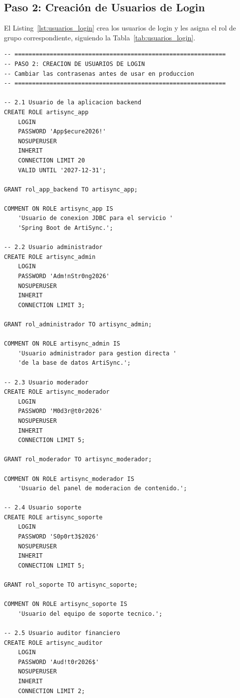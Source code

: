 \documentclass[conference, onecolumn]{IEEEtran}
\begin{document}
\subsection{Paso 2: Creación de Usuarios de Login}

El Listing~\ref{lst:usuarios_login} crea los usuarios de login y les asigna el rol de grupo correspondiente, siguiendo la Tabla~\ref{tab:usuarios_login}.

\begin{lstlisting}[caption={Creación de usuarios de login}, label={lst:usuarios_login}]
-- ============================================================
-- PASO 2: CREACION DE USUARIOS DE LOGIN
-- Cambiar las contrasenas antes de usar en produccion
-- ============================================================

-- 2.1 Usuario de la aplicacion backend
CREATE ROLE artisync_app
    LOGIN
    PASSWORD 'App$ecure2026!'
    NOSUPERUSER
    INHERIT
    CONNECTION LIMIT 20
    VALID UNTIL '2027-12-31';

GRANT rol_app_backend TO artisync_app;

COMMENT ON ROLE artisync_app IS
    'Usuario de conexion JDBC para el servicio '
    'Spring Boot de ArtiSync.';

-- 2.2 Usuario administrador
CREATE ROLE artisync_admin
    LOGIN
    PASSWORD 'Adm!nStr0ng2026'
    NOSUPERUSER
    INHERIT
    CONNECTION LIMIT 3;

GRANT rol_administrador TO artisync_admin;

COMMENT ON ROLE artisync_admin IS
    'Usuario administrador para gestion directa '
    'de la base de datos ArtiSync.';

-- 2.3 Usuario moderador
CREATE ROLE artisync_moderador
    LOGIN
    PASSWORD 'M0d3r@t0r2026'
    NOSUPERUSER
    INHERIT
    CONNECTION LIMIT 5;

GRANT rol_moderador TO artisync_moderador;

COMMENT ON ROLE artisync_moderador IS
    'Usuario del panel de moderacion de contenido.';

-- 2.4 Usuario soporte
CREATE ROLE artisync_soporte
    LOGIN
    PASSWORD 'S0p0rt3$2026'
    NOSUPERUSER
    INHERIT
    CONNECTION LIMIT 5;

GRANT rol_soporte TO artisync_soporte;

COMMENT ON ROLE artisync_soporte IS
    'Usuario del equipo de soporte tecnico.';

-- 2.5 Usuario auditor financiero
CREATE ROLE artisync_auditor
    LOGIN
    PASSWORD 'Aud!t0r2026$'
    NOSUPERUSER
    INHERIT
    CONNECTION LIMIT 2;


\end{lstlisting}
\end{document}
